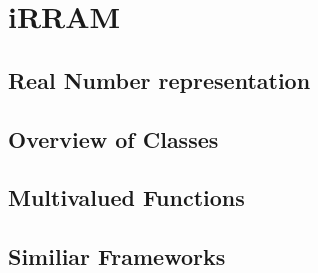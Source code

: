 \section{iRRAM}
	\subsection{Real Number representation}
	\subsection{Overview of Classes}
	\subsection{Multivalued Functions}
	\subsection{Similiar Frameworks}
